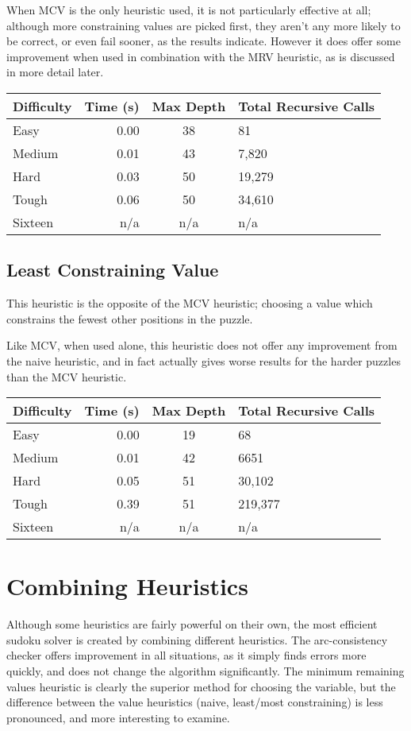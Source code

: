 \documentclass{article}
\begin{document}
When MCV is the only heuristic used, it is not particularly effective at all;
although more constraining values are picked first, they aren't any more likely
to be correct, or even fail sooner, as the results indicate. However it does 
offer some improvement when used in combination with the MRV heuristic, as is
discussed in more detail later. \bigskip

\begin{tabular}{l || r | c | l }
Difficulty & Time (s) & Max Depth & Total Recursive Calls \\ \hline
Easy    & 0.00   & 38   & 81 \\
Medium  & 0.01   & 43   & 7,820 \\
Hard    & 0.03   & 50  & 19,279 \\
Tough   & 0.06   & 50  & 34,610 \\
Sixteen & n/a & n/a  & n/a \\ 
\end{tabular}

\subsection{Least Constraining Value}
This heuristic is the opposite of the MCV heuristic; choosing a value
which constrains the fewest other positions in the puzzle.

Like MCV, when used alone, this heuristic does not offer any improvement
from the naive heuristic, and in fact actually gives worse results for the
harder puzzles than the MCV heuristic. \bigskip

\begin{tabular}{l || r | c | l }
Difficulty & Time (s) & Max Depth & Total Recursive Calls \\ \hline
Easy    & 0.00   & 19   & 68 \\
Medium  & 0.01   & 42   & 6651 \\
Hard    & 0.05   & 51  & 30,102 \\
Tough   & 0.39   & 51  & 219,377 \\
Sixteen & n/a & n/a  & n/a \\ 
\end{tabular}

\section{Combining Heuristics}
Although some heuristics are fairly powerful on their own, the most efficient
sudoku solver is created by combining different heuristics. The arc-consistency
checker offers improvement in all situations, as it simply finds errors more
quickly, and does not change the algorithm significantly. The minimum remaining
values heuristic is clearly the superior method for choosing the variable, but
the difference between the value heuristics (naive, least/most constraining) is
less pronounced, and more interesting to examine.
\end{document}
